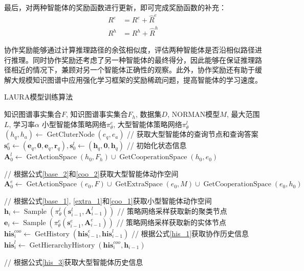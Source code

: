 \documentclass[algorithmlist, AutoFakeBold, AutoFakeSlant, figurelist, tablelist, nomlist, engineering, openany]{seuthesix} %
\begin{document}
最后，对两种智能体的奖励函数进行更新，即可完成奖励函数的补充：
\begin{equation}
  \begin{aligned}
    R^e &= R^e + \hat{R}^e \\
    R^h &= R^h + \hat{R}^h
  \end{aligned}
  \label{similar_reward}
\end{equation}

协作奖励能够通过计算推理路径的余弦相似度，评估两种智能体是否沿相似路径进行推理。同时协作奖励还考虑了另一种智能体的最终得分，因此能够在保证推理路径相近的情况下，兼顾对另一个智能体正确性的观察。此外，协作奖励还有助于缓解大规模知识图谱中应用强化学习框架的奖励稀疏问题，提高智能体的学习速度。

\begin{algorithm}[H]
	\caption{LAURA模型训练算法}  
	\label{algorithm_dualagent}
	\begin{algorithmic}[1]
  \Require 知识图谱事实集合$F$, 知识图谱事实集合$F_h$, 数据集$D$, NORMAN模型$M$, 最大范围$L$, 学习率$\alpha$
  \Ensure 小型智能体策略网络$\pi_\theta^e$, 大型智能体策略网络$\pi_\theta^l$
  \State $(h_q, h_a) \leftarrow \operatorname{GetCluterNode}(e_q, e_a)$ // 获取大型智能体的查询节点和查询答案
  \State $\bm{s}_{0}^{e} \leftarrow (\bm{e}_q, \bm{0}, \bm{e}_q, \bm{r}_q), \bm{s}_{0}^{l} \leftarrow (\bm{h}_q, \bm{0}, \bm{h}_q)$ // 初始化状态信息
  \State $\bm{A}_{0}^{l} \leftarrow \operatorname{GetActionSpace}(h_0, F_h) \cup \operatorname{GetCooperationSpace}(h_0, e_0)$ \par\quad// 根据公式\ref{base_2}和\ref{coo_2}获取大型智能体动作空间
  \State $\bm{A}_{0}^{e} \leftarrow \operatorname{GetActionSpace}(e_0, F) \cup \operatorname{GetExtraSpace}(e_0, M) \cup \operatorname{GetCooperationSpace}(e_0, h_0)$ \par\quad// 根据公式\ref{base_1}, \ref{extra_1}和\ref{coo_1}获取小型智能体动作空间
  \State $\bm{h}_i \leftarrow \operatorname{Sample}(\pi_\theta^l(\bm{s}_{i-1}^{l}, \bm{A}_{i-1}^{l}))$ // 策略网络采样获取新的聚类节点
  \State $\bm{e}_i \leftarrow \operatorname{Sample}(\pi_\theta^e(\bm{s}_{i-1}^{e}, \bm{A}_{i-1}^{e}))$ // 策略网络采样获取新的实体节点
  \State $\bm{his}_{i}^{coo} \leftarrow \operatorname{GetHistory}(\bm{his}_{i-1}^{e}, \bm{his}_{i-1}^{l})$ // 根据公式\ref{his_1}获取协作历史信息
  \State $\bm{his}_{i}^{l} \leftarrow \operatorname{GetHierarchyHistory}(\bm{his}_{i}^{coo}, \bm{h}_{i-1})$ \par\quad\quad // 根据公式\ref{his_3}获取大型智能体历史信息

\end{algorithmic}
\end{algorithm}
\end{document}
